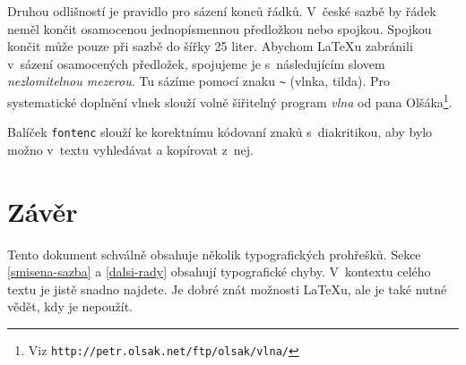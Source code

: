 \documentclass[twocolumn, a4paper]{article}
\begin{document}
Druhou odlišností je pravidlo pro sázení konců řádků. V~české sazbě by řádek neměl končit osamocenou jednopísmennou předložkou nebo spojkou. Spojkou  končit může pouze při sazbě do šířky 25 liter. Abychom \LaTeX u zabránili v~sázení osamocených předložek, spojujeme je s~následujícím slovem \emph{nezlomitelnou mezerou}. Tu sázíme pomocí znaku \verb|~| (vlnka, tilda). Pro systematické doplnění vlnek slouží volně šiřitelný program \emph{vlna} od pana Olšáka\footnote{Viz \texttt{http://petr.olsak.net/ftp/olsak/vlna/}}.

Balíček \texttt{fontenc} slouží ke korektnímu kódovaní znaků s~diakritikou, aby bylo možno v~textu vyhledávat a kopírovat z~nej.

\section{Závěr}

Tento dokument schválně obsahuje několik typografických prohřešků. Sekce \ref{smisena-sazba} a \ref{dalsi-rady} obsahují typografické chyby. V~kontextu celého textu je jistě snadno najdete. Je dobré znát možnosti \LaTeX u, ale je také nutné vědět, kdy je nepoužít.
\end{document}
